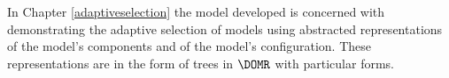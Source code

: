 In Chapter \ref{adaptiveselection} the model developed is concerned with
demonstrating the adaptive selection of models using abstracted
representations of the model's components and of the model's
configuration. These representations are in the form of trees in
$\DOMR$ with particular forms.










